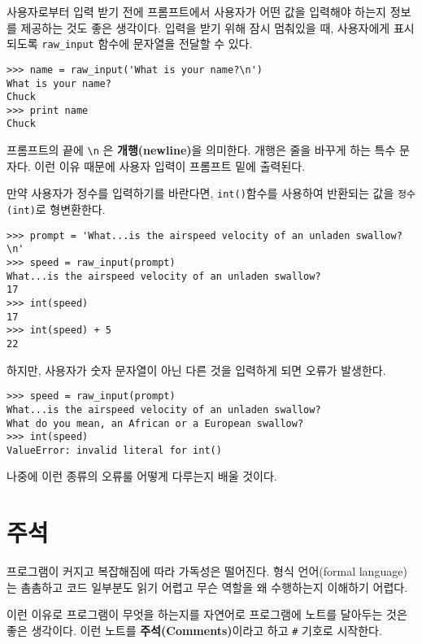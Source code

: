 사용자로부터 입력 받기 전에 프롬프트에서 사용자가 어떤 값을 입력해야 하는지 정보를 제공하는 것도 좋은 생각이다. 
입력을 받기 위해 잠시 멈춰있을 때, 사용자에게 표시되도록 \verb"raw_input" 함수에 문자열을 전달할 수 있다.


\beforeverb
\begin{verbatim}
>>> name = raw_input('What is your name?\n')
What is your name?
Chuck
>>> print name
Chuck
\end{verbatim}
\afterverb
%

프롬프트의 끝에 \verb"\n" 은 {\bf 개행(newline)}을 의미한다. 개행은 줄을 바꾸게 하는 특수 문자다. 
이런 이유 때문에 사용자 입력이 프롬프트 밑에 출력된다.


만약 사용자가 정수를 입력하기를 바란다면, 
{\tt int()}함수를 사용하여 반환되는 값을 {\tt 정수(int)}로 형변환한다.

\beforeverb
\begin{verbatim}
>>> prompt = 'What...is the airspeed velocity of an unladen swallow?\n'
>>> speed = raw_input(prompt)
What...is the airspeed velocity of an unladen swallow?
17
>>> int(speed)
17
>>> int(speed) + 5
22
\end{verbatim}
\afterverb
%

하지만, 사용자가 숫자 문자열이 아닌 다른 것을 입력하게 되면 오류가 발생한다.

\beforeverb
\begin{verbatim}
>>> speed = raw_input(prompt)
What...is the airspeed velocity of an unladen swallow?
What do you mean, an African or a European swallow?
>>> int(speed)
ValueError: invalid literal for int()
\end{verbatim}
\afterverb
%

나중에  이런 종류의 오류룰 어떻게 다루는지 배울 것이다.



\section{주석}

프로그램이 커지고 복잡해짐에 따라 가독성은 떨어진다. 형식 언어(formal language)는 촘촘하고 코드 일부분도 읽기 어렵고 무슨 역할을 왜 수행하는지 이해하기 어렵다.

이런 이유로 프로그램이 무엇을 하는지를 자연어로 프로그램에 노트를 달아두는 것은 좋은 생각이다. 
이런 노트를 {\bf 주석(Comments)}이라고 하고 \verb"#" 기호로 시작한다.

